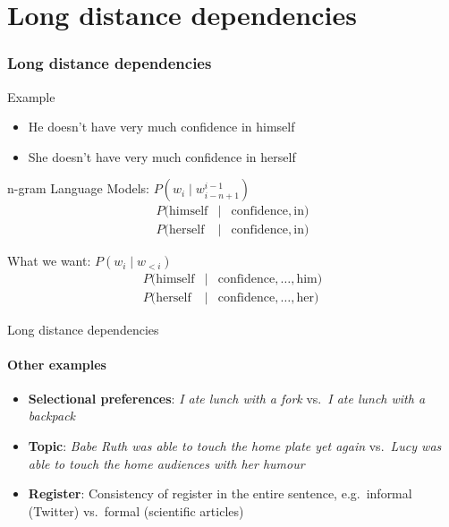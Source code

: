 



\section{Long distance dependencies}

\begin{frame}
\frametitle{Long distance dependencies}
\begin{block}{Example}
\begin{itemize}[<+->]
\item {\color{blue} He} doesn't have very much confidence in {\color{blue} himself}
\item {\color{blue} She} doesn't have very much confidence in {\color{blue} herself}
\end{itemize}

\pause
\end{block}
\begin{block}{n-gram Language Models: $P(w_i \mid w_{i-n+1}^{i-1})$}
\begin{eqnarray*}
P(\text{himself} &\mid& \text{confidence}, \text{in} ) \\
P(\text{herself} &\mid& \text{confidence}, \text{in} ) 
\end{eqnarray*}
\end{block}

\pause
\begin{block}{What we want: $P(w_i \mid w_{<i})$}
\begin{eqnarray*}
P(\text{himself} &\mid& \text{confidence}, \ldots, \text{him} ) \\
P(\text{herself} &\mid& \text{confidence}, \ldots, \text{her} ) 
\end{eqnarray*}
\end{block}
\end{frame}

\begin{frame}{Long distance dependencies}
\framesubtitle{Other examples}	
\begin{itemize}[<+->]
	\item \textbf{Selectional preferences}: \textit{I ate lunch with a {\color{blue} fork}} vs.\ \textit{I ate lunch with a {\color{blue} backpack}}
	\item \textbf{Topic}: \textit{Babe Ruth was able to touch the home {\color{blue} plate} yet again} vs.\ \textit{Lucy was able to touch the home {\color{blue} audiences} with her humour}
	\item \textbf{Register}: Consistency of register in the entire sentence, e.g.\ informal (Twitter) vs.\ formal (scientific articles)
\end{itemize}
\end{frame}

